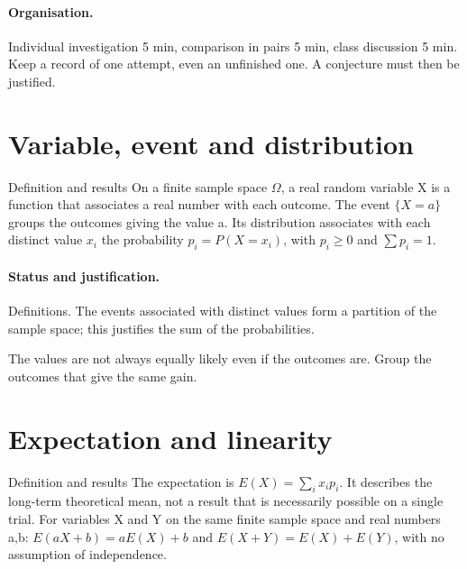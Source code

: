 \paragraph{Organisation.} Individual investigation 5 min, comparison in pairs 5 min, class discussion 5 min. Keep a record of one attempt, even an unfinished one. A conjecture must then be justified.
\section{Variable, event and distribution}\label{C08-U1}
\begin{repere}{Definition and results}
On a finite sample space $\Omega$, a real random variable X is a function that associates a real number with each outcome. The event $\{X=a\}$ groups the outcomes giving the value a. Its distribution associates with each distinct value $x_i$ the probability $p_i=P(X=x_i)$, with $p_i\geq0$ and $\sum p_i=1$.
\end{repere}
\paragraph{Status and justification.} Definitions. The events associated with distinct values form a partition of the sample space; this justifies the sum of the probabilities.
\label{C08-EX1}

\begin{erreur}The values are not always equally likely even if the outcomes are. Group the outcomes that give the same gain.\end{erreur}
\label{C08-AP1}
\section{Expectation and linearity}\label{C08-U2}
\begin{repere}{Definition and results}
The expectation is $E(X)=\sum_i x_ip_i$. It describes the long-term theoretical mean, not a result that is necessarily possible on a single trial. For variables X and Y on the same finite sample space and real numbers a,b: $E(aX+b)=aE(X)+b$ and $E(X+Y)=E(X)+E(Y)$, with no assumption of independence.
\end{repere}
